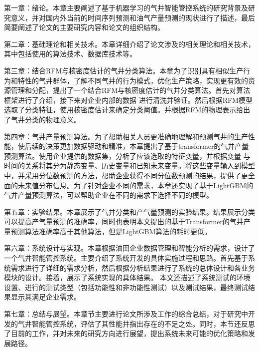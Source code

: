 第一章：绪论。本章主要阐述了基于机器学习的气井智能管控系统的研究背景及研究意义，并对国内外当前的时间序列预测和油气产量预测的现状进行了描述，最后简要阐述了论文的主要研究内容和论文的组织结构。

第二章：基础理论和相关技术。本章详细介绍了论文涉及的相关理论和相关技术，其中包括使用的算法技术、数据库技术等。

第三章：结合RFM与核密度估计的气井分类算法。本章为了识别具有相似生产行为和特性的气井群体，了解不同气井的行为模式，优化生产策略，实现更有效的资源管理和分配，提出了一个结合RFM与核密度估计的气井分类算法。首先对算法框架进行了介绍，接下来对企业内部的数据
进行清洗并验证。然后根据RFM模型选取了分类特征，使用核密度估计来确定分类阈值。并根据RFM的物理表示给出了气井分类的物理意义。

第四章：气井产量预测算法。为了帮助相关人员更准确地理解和预测气井的生产性能，使后续的决策更加数据驱动和精准，本章提出了基于transformer的气井产量预测算法。使用企业提供的数据集，分析了应该选取的特征变量，并根据变量
与时间的关系将其分为静态变量、历史变量和已知未来变量。将这些变量输入到模型中，并采用分位数预测的方法，帮助企业获得不同分位数预测的结果，提供了更全面的未来值分布信息。为了针对企业不同的需求，本章还实现了基于LightGBM的气井产量预测算法，可以帮助企业在不同的需求下选择不同的模型。

第五章：实验结果。本章展示了气井分类和产气量预测的实验结果。结果展示分类可以提高产气量预测的准确率，同时也表明本文提出的基于Transformer的气井产量预测算法准确率高于其他算法，但是LightGBM算法的耗时更低。

第六章：系统设计与实现。本章根据油田企业数据管理和智能分析的需求，设计了一个气井智能管控系统。主要介绍了系统开发的具体实施过程和思路。首先基于系统需求进行了详细的需求分析，然后根据分析结果进行了系统的总体设计和各业务模块的设计。接着，展示了系统实现的具体结果。
本文还描述了系统测试的环境设置、进行的测试类型（包括功能性和非功能性测试）以及测试结果，最终测试结果显示其满足企业需求。

第七章：总结与展望。本章节主要进行论文所涉及工作的综合总结，对于研究中开发的气井智能管控系统，评估了其性能并指出存在的不足之处。同时，本节还反思了目前的工作，并对未来的研究方向进行展望，提出系统未来可能的优化策略和发展路径。